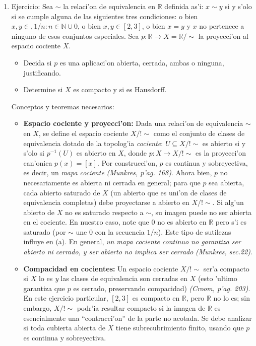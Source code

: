 \documentclass[a4paper,11pt]{article}  %
\begin{document}
\begin{enumerate}
\item Ejercicio: Sea $\sim$ la relaci'on de equivalencia en $\mathbb{R}$ definida as'i: $x\sim y$ si y s'olo si se cumple alguna de las siguientes tres condiciones: o bien $x,y\in {,1/n: n\in\mathbb{N}}\cup{0}$, o bien $x,y\in [2,3]$, o bien $x=y$ y $x$ no pertenece a ninguno de esos conjuntos especiales. Sea $p: \mathbb{R}\to X=\mathbb{R}/\sim$ la proyecci'on al espacio cociente $X$.
\begin{itemize}
\item[(a)] Decida si $p$ es una aplicaci'on abierta, cerrada, ambas o ninguna, justificando.
\item[(b)] Determine si $X$ es compacto y si es Hausdorff.
\end{itemize} Conceptos y teoremas necesarios:
\begin{itemize}
\item \textbf{Espacio cociente y proyecci'on:} Dada una relaci'on de equivalencia $\sim$ en $X$, se define el espacio cociente $X/!\sim$ como el conjunto de clases de equivalencia dotado de la topolog'ia \emph{cociente}: $U\subseteq X/!\sim$ es abierto si y s'olo si $p^{-1}(U)$ es abierto en $X$, donde $p: X\to X/!\sim$ es la proyecci'on can'onica $p(x)=[x]$. Por construcci'on, $p$ es continua y sobreyectiva, es decir, un \emph{mapa cociente} \emph{(Munkres, p'ag. 168)}. Ahora bien, $p$ no necesariamente es abierta ni cerrada en general; para que $p$ sea abierta, cada abierto saturado de $X$ (un abierto que es uni'on de clases de equivalencia completas) debe proyectarse a abierto en $X/!\sim$. Si alg'un abierto de $X$ no es saturado respecto a $\sim$, su imagen puede no ser abierta en el cociente. En nuestro caso, note que ${0}$ no es abierto en $\mathbb{R}$ pero s'i es saturado (por $\sim$ une $0$ con la secuencia $1/n$). Este tipo de sutilezas influye en (a). En general, \emph{un mapa cociente continuo no garantiza ser abierto ni cerrado, y ser abierto no implica ser cerrado} \emph{(Munkres, sec.22)}.
\item \textbf{Compacidad en cocientes:} Un espacio cociente $X/!\sim$ ser'a compacto si $X$ lo es \emph{y} las clases de equivalencia son cerradas en $X$ (esto 'ultimo garantiza que $p$ es cerrado, preservando compacidad) \emph{(Croom, p'ag. 203)}. En este ejercicio particular, $[2,3]$ es compacto en $\mathbb{R}$, pero $\mathbb{R}$ no lo es; sin embargo, $X/!\sim$ podr'ia resultar compacto si la imagen de $\mathbb{R}$ es esencialmente una “contracci'on” de la parte no acotada. Se debe analizar si toda cubierta abierta de $X$ tiene subrecubrimiento finito, usando que $p$ es continua y sobreyectiva.

\end{itemize}
\end{enumerate}
\end{document}
